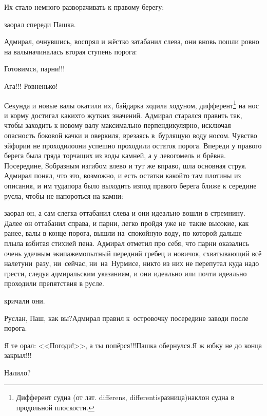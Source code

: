 Их стало немного разворачивать к правому берегу:

\mdash заорал спереди Пашка.

Адмирал, очнувшись, воспрял и жёстко затабанил слева, они вновь пошли ровно на валы\mdash начиналась вторая ступень порога:

\diagdash Готовимся, парни!!!

\diagdash Ага!!! Ровненько!

\renewcommand*{\thefootnote}{\fnsymbol{footnote}}
\setcounter{footnote}{0}
Секунда и новые валы окатили их, байдарка ходила ходуном, дифферент\footnote{Дифферент судна (от лат. differens, differentis\mdash разница)\mdash наклон судна в продольной плоскости\cite{МорскойСправочник}.} на нос и корму достигал каких\sdash то жутких значений. Адмирал старался править так, чтобы заходить к новому валу максимально перпендикулярно, исключая опасность боковой качки и оверкиля, врезаясь в~бурлящую воду носом. Чувство эйфории не проходило\mdash они успешно проходили остаток порога. Впереди у правого берега была гряда торчащих из воды камней, а у левого\mdash мель и брёвна. Посередине, S\sdash образным изгибом влево и тут же вправо, шла основная струя. Адмирал понял, что это, возможно, и есть остатки какой\sdash то там плотины из описания, и им туда\mdash пора было выходить из\sdash под правого берега ближе к середине русла, чтобы не напороться на камни:

\mdash заорал он, а сам слегка оттабанил слева и они идеально вошли в стремнину. Далее он оттабанил справа, и парни, легко пройдя уже не~такие высокие, как ранее, валы в конце порога, вышли на~спокойную воду, по которой дальше плыла взбитая стихией пена. Адмирал отметил про себя, что парни оказались очень удачным экипажем\mdash опытный передний гребец и новичок, схватывающий всё налету\mdash ни~разу, ни~сейчас, ни~на~Нурмисе, никто из них не перепутал куда надо грести, следуя адмиральским указаниям, и они идеально или почти идеально проходили препятствия в русле.

\mdash кричали они.

\diagdash Руслан, Паш, как вы?\mdash Адмирал правил к~островочку посередине заводи после порога.

\diagdash Я те орал: <<Погоди!>>, а ты попёрся!!!\mdash Пашка обернулся.\mdash Я ж юбку не до конца закрыл!!!

\diagdash Налило?

